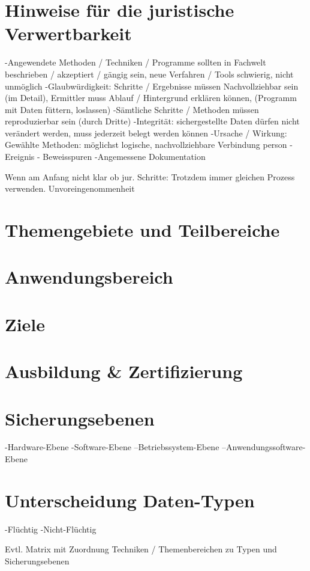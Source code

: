 \section{Hinweise für die juristische Verwertbarkeit}
-Angewendete Methoden / Techniken / Programme sollten in Fachwelt beschrieben / akzeptiert / gängig sein, neue Verfahren / Tools schwierig, nicht unmöglich
-Glaubwürdigkeit: Schritte / Ergebnisse müssen Nachvollziehbar sein (im Detail), Ermittler muss Ablauf / Hintergrund erklären können, (Programm mit Daten füttern, loslassen)
-Sämtliche Schritte / Methoden müssen reproduzierbar sein (durch Dritte)
-Integrität: sichergestellte Daten dürfen nicht verändert werden, muss jederzeit belegt werden können
-Ursache / Wirkung: Gewählte Methoden: möglichst logische, nachvollziehbare Verbindung person - Ereignis - Beweisspuren
-Angemessene Dokumentation


Wenn am Anfang nicht klar ob jur. Schritte: Trotzdem immer gleichen Prozess verwenden.
Unvoreingenommenheit
\section{Themengebiete und Teilbereiche}

\section{Anwendungsbereich}

\section{Ziele}

\section{Ausbildung \& Zertifizierung}


\section{Sicherungsebenen}
-Hardware-Ebene
-Software-Ebene
--Betriebssystem-Ebene
--Anwendungssoftware-Ebene

\section{Unterscheidung Daten-Typen}
-Flüchtig
-Nicht-Flüchtig

Evtl. Matrix mit Zuordnung Techniken / Themenbereichen zu Typen und Sicherungsebenen
